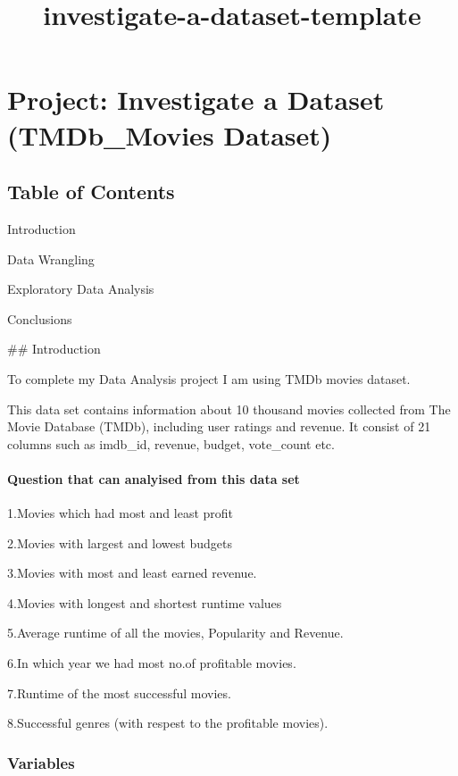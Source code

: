 \documentclass[11pt]{article}
\title{investigate-a-dataset-template}
\begin{document}
    
    
    \maketitle
    
    

    
    \section{Project: Investigate a Dataset (TMDb\_Movies
Dataset)}\label{project-investigate-a-dataset-tmdb_movies-dataset}

\subsection{Table of Contents}\label{table-of-contents}

Introduction

Data Wrangling

Exploratory Data Analysis

Conclusions

     \#\# Introduction

To complete my Data Analysis project I am using TMDb movies dataset.

This data set contains information about 10 thousand movies collected
from The Movie Database (TMDb), including user ratings and revenue. It
consist of 21 columns such as imdb\_id, revenue, budget, vote\_count
etc.

\paragraph{Question that can analyised from this data
set}\label{question-that-can-analyised-from-this-data-set}

1.Movies which had most and least profit

2.Movies with largest and lowest budgets

3.Movies with most and least earned revenue.

4.Movies with longest and shortest runtime values

5.Average runtime of all the movies, Popularity and Revenue.

6.In which year we had most no.of profitable movies.

7.Runtime of the most successful movies.

8.Successful genres (with respest to the profitable movies).

    \subsubsection{Variables}\label{variables}
\end{document}
